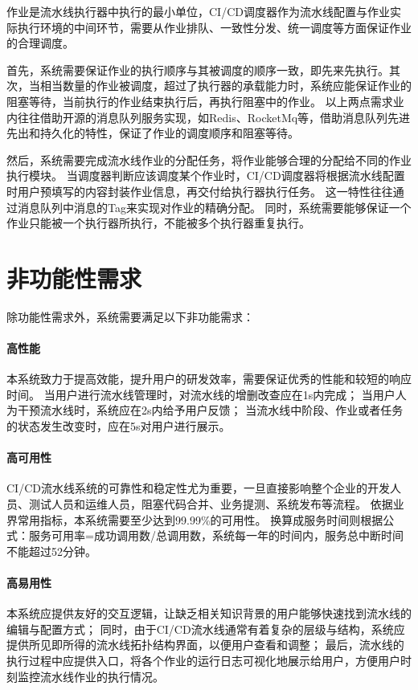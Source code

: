 作业是流水线执行器中执行的最小单位，CI/CD调度器作为流水线配置与作业实际执行环境的中间环节，需要从作业排队、一致性分发、统一调度等方面保证作业的合理调度。

首先，系统需要保证作业的执行顺序与其被调度的顺序一致，即先来先执行。其次，当相当数量的作业被调度，超过了执行器的承载能力时，系统应能保证作业的阻塞等待，当前执行的作业结束执行后，再执行阻塞中的作业。
以上两点需求业内往往借助开源的消息队列服务实现，如Redis、RocketMq等，借助消息队列先进先出和持久化的特性，保证了作业的调度顺序和阻塞等待。

然后，系统需要完成流水线作业的分配任务，将作业能够合理的分配给不同的作业执行模块。
当调度器判断应该调度某个作业时，CI/CD调度器将根据流水线配置时用户预填写的内容封装作业信息，再交付给执行器执行任务。
这一特性往往通过消息队列中消息的Tag来实现对作业的精确分配。
同时，系统需要能够保证一个作业只能被一个执行器所执行，不能被多个执行器重复执行。


\section{非功能性需求}



除功能性需求外，系统需要满足以下非功能需求：

\paragraph{高性能}
本系统致力于提高效能，提升用户的研发效率，需要保证优秀的性能和较短的响应时间。
当用户进行流水线管理时，对流水线的增删改查应在1s内完成；
当用户人为干预流水线时，系统应在2s内给予用户反馈；
当流水线中阶段、作业或者任务的状态发生改变时，应在5s对用户进行展示。

\paragraph{高可用性}
CI/CD流水线系统的可靠性和稳定性尤为重要，一旦直接影响整个企业的开发人员、测试人员和运维人员，阻塞代码合并、业务提测、系统发布等流程。
依据业界常用指标，本系统需要至少达到99.99\%的可用性。
换算成服务时间则根据公式：服务可用率=成功调用数/总调用数，系统每一年的时间内，服务总中断时间不能超过52分钟。

\paragraph{高易用性}
本系统应提供友好的交互逻辑，让缺乏相关知识背景的用户能够快速找到流水线的编辑与配置方式；
同时，由于CI/CD流水线通常有着复杂的层级与结构，系统应提供所见即所得的流水线拓扑结构界面，以便用户查看和调整；
最后，流水线的执行过程中应提供入口，将各个作业的运行日志可视化地展示给用户，方便用户时刻监控流水线作业的执行情况。

